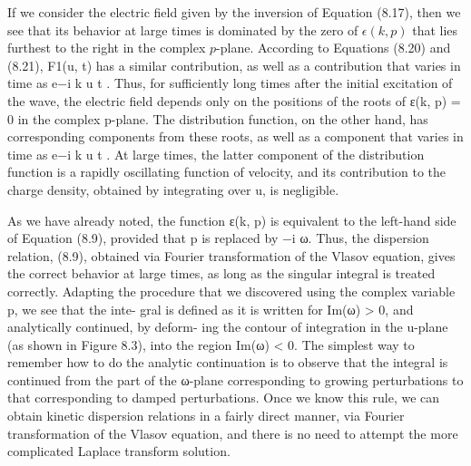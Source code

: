 \documentclass[12pt,a4paper]{article}
\begin{document}
If we consider the electric field given by the inversion of Equation (8.17), then we see that its behavior at large times is dominated by the zero of $\epsilon(k, p)$ that lies furthest to the right in the complex $p$-plane. According to Equations (8.20) and (8.21), F1(u, t) has a similar contribution, as well as a contribution that varies in time as e−i k u t . Thus, for sufficiently long times after the initial excitation of the wave, the electric field depends only on the positions of the roots of ε(k, p) = 0 in the complex p-plane. The distribution function, on the other hand, has corresponding components from these roots, as well as a component that varies in time as e−i k u t . At large times, the latter component of the distribution function is a rapidly oscillating function of velocity, and its contribution to the charge density, obtained by integrating over u, is negligible.
 
As we have already noted, the function ε(k, p) is equivalent to the left-hand side of Equation (8.9), provided that p is replaced by −i ω. Thus, the dispersion relation, (8.9), obtained via Fourier transformation of the Vlasov equation, gives the correct behavior at large times, as long as the singular integral is treated correctly. Adapting the procedure that we discovered using the complex variable p, we see that the inte- gral is defined as it is written for Im(ω) > 0, and analytically continued, by deform- ing the contour of integration in the u-plane (as shown in Figure 8.3), into the region Im(ω) < 0. The simplest way to remember how to do the analytic continuation is to observe that the integral is continued from the part of the ω-plane corresponding to growing perturbations to that corresponding to damped perturbations. Once we know this rule, we can obtain kinetic dispersion relations in a fairly direct manner, via Fourier transformation of the Vlasov equation, and there is no need to attempt the more complicated Laplace transform solution.
 


\end{document}
